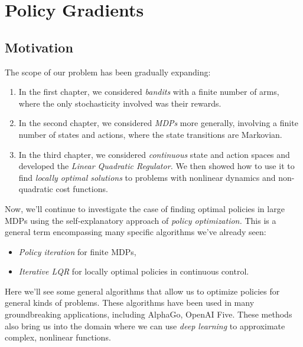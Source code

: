 \documentclass[\main/main]{subfiles}
\begin{document}

\chapter{Policy Gradients}

\section{Motivation}

The scope of our problem has been gradually expanding:

\begin{enumerate}
    \item In the first chapter, we considered \emph{bandits} with a finite number of arms, where the only stochasticity involved was their rewards.
    \item In the second chapter, we considered \emph{MDPs} more generally, involving a finite number of states and actions, where the state transitions are Markovian.
    \item In the third chapter, we considered \emph{continuous} state and action spaces and developed the \emph{Linear Quadratic Regulator.} We then showed how to use it to find \emph{locally optimal solutions} to problems with nonlinear dynamics and non-quadratic cost functions.
\end{enumerate}

Now, we'll continue to investigate the case of finding optimal policies in large MDPs using the self-explanatory approach of \emph{policy optimization.} This is a general term encompassing many specific algorithms we've already seen:

\begin{itemize}
    \item \emph{Policy iteration} for finite MDPs,
    \item \emph{Iterative LQR} for locally optimal policies in continuous control.
\end{itemize}

Here we'll see some general algorithms that allow us to optimize policies for general kinds of problems. These algorithms have been used in many groundbreaking applications, including AlphaGo, OpenAI Five. These methods also bring us into the domain where we can use \emph{deep learning} to approximate complex, nonlinear functions.

\end{document}

